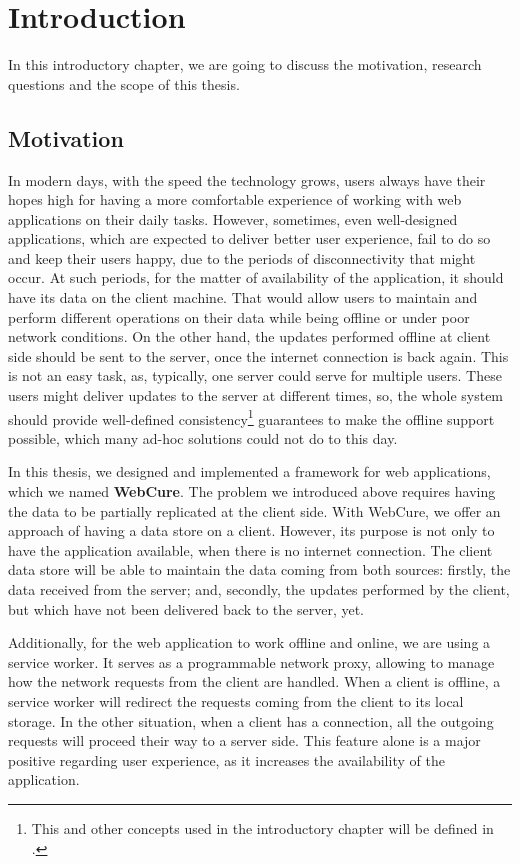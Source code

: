 \chapter{Introduction}
\label{Introduction}

In this introductory chapter, we are going to discuss the motivation, research questions and the scope of this thesis.

\section{Motivation}
\label{Introduction-Motivation}

In modern days, with the speed the technology grows, users always have their hopes high for having a more comfortable experience of working with web applications on their daily tasks. However, sometimes, even well-designed applications, which are expected to deliver better user experience, fail to do so and keep their users happy, due to the periods of disconnectivity that might occur. At such periods, for the matter of availability of the application, it should have its data on the client machine. That would allow users to maintain and perform different operations on their data while being offline or under poor network conditions. On the other hand, the updates performed offline at client side should be sent to the server, once the internet connection is back again. This is not an easy task, as, typically, one server could serve for multiple users. These users might deliver updates to the server at different times, so, the whole system should provide well-defined consistency\footnote{This and other concepts used in the introductory chapter will be defined in .} guarantees to make the offline support possible, which many ad-hoc solutions could not do to this day.

In this thesis, we designed and implemented a framework for web applications, which we named \textbf{WebCure}. The problem we introduced above requires having the data to be partially replicated at the client side. With WebCure, we offer an approach of having a data store on a client. However, its purpose is not only to have the application available, when there is no internet connection. The client data store will be able to maintain the data coming from both sources: firstly, the data received from the server; and, secondly, the updates performed by the client, but which have not been delivered back to the server, yet. 

Additionally, for the web application to work offline and online, we are using a service worker. It serves as a programmable network proxy\cite{32}, allowing to manage how the network requests from the client are handled. When a client is offline, a service worker will redirect the requests coming from the client to its local storage. In the other situation, when a client has a connection, all the outgoing requests will proceed their way to a server side. This feature alone is a major positive regarding user experience, as it increases the availability of the application. 


